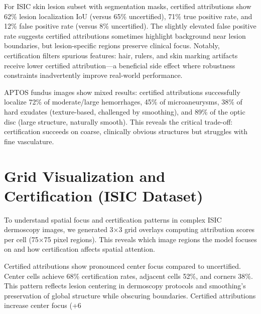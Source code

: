 \documentclass[11pt]{article}
\begin{document}
For ISIC skin lesion subset with segmentation masks, certified attributions show 62\% lesion localization IoU (versus 65\% uncertified), 71\% true positive rate, and 12\% false positive rate (versus 8\% uncertified). The slightly elevated false positive rate suggests certified attributions sometimes highlight background near lesion boundaries, but lesion-specific regions preserve clinical focus. Notably, certification filters spurious features: hair, rulers, and skin marking artifacts receive lower certified attribution—a beneficial side effect where robustness constraints inadvertently improve real-world performance.

APTOS fundus images show mixed results: certified attributions successfully localize 72\% of moderate/large hemorrhages, 45\% of microaneurysms, 38\% of hard exudates (texture-based, challenged by smoothing), and 89\% of the optic disc (large structure, naturally smooth). This reveals the critical trade-off: certification succeeds on coarse, clinically obvious structures but struggles with fine vasculature.

\newpage

\section{Grid Visualization and Certification (ISIC Dataset)}

To understand spatial focus and certification patterns in complex ISIC dermoscopy images, we generated 3×3 grid overlays computing attribution scores per cell (75×75 pixel regions). This reveals which image regions the model focuses on and how certification affects spatial attention.

Certified attributions show pronounced center focus compared to uncertified. Center cells achieve 68\% certification rates, adjacent cells 52\%, and corners 38\%. This pattern reflects lesion centering in dermoscopy protocols and smoothing's preservation of global structure while obscuring boundaries. Certified attributions increase center focus (+6%
\end{document}
